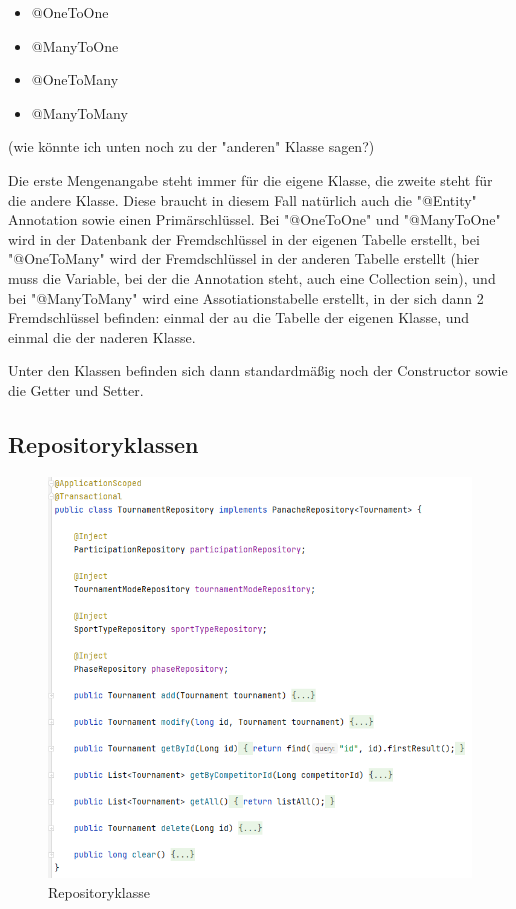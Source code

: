 \begin{itemize}
    \item @OneToOne
    \item @ManyToOne
    \item @OneToMany
    \item @ManyToMany
\end{itemize}

(wie könnte ich unten noch zu der "anderen" Klasse sagen?)

Die erste Mengenangabe steht immer für die eigene Klasse, die zweite steht für die andere Klasse. Diese braucht in diesem Fall natürlich auch die "@Entity" Annotation sowie einen Primärschlüssel. 
Bei "@OneToOne" und "@ManyToOne" wird in der Datenbank der Fremdschlüssel in der eigenen Tabelle erstellt, bei "@OneToMany" wird der Fremdschlüssel in der anderen Tabelle 
erstellt (hier muss die Variable, bei der die Annotation steht, auch eine Collection sein), und bei "@ManyToMany" wird eine Assotiationstabelle erstellt, in der sich dann 2 Fremdschlüssel befinden: 
einmal der au die Tabelle der eigenen Klasse, und einmal die der naderen Klasse.

Unter den Klassen befinden sich dann standardmäßig noch der Constructor sowie die Getter und Setter.

\subsection{Repositoryklassen}

\begin{figure}[H]
    \includegraphics[scale=0.8]{pics/repository_class.png}
    \caption{Repositoryklasse}
\end{figure}

